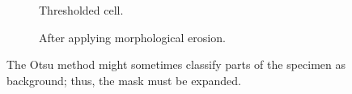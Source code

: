 \documentclass[
  digital,     %
  oneside,     %
  nosansbold,  %
  nocolorbold, %
  lof,         %
  lot,         %
]{fithesis4}
\begin{document}
\begin{figure}
    \begin{subfigure}[t]{0.45\textwidth}
        \centering
        \caption{Thresholded cell.}
    \end{subfigure}
    \begin{subfigure}[t]{0.45\linewidth}
        \centering
        \caption{After applying morphological erosion.}
    \end{subfigure}
    \caption{The Otsu method might sometimes classify parts of the specimen as
    background; thus, the mask must be expanded.}
    \label{fig:cell-mask}
\end{figure}
\end{document}
